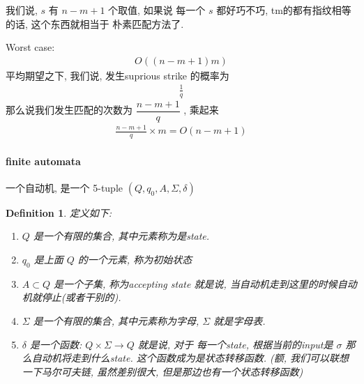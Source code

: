 \documentclass[a4paper, 10pt]{ctexart} %
\newtheorem{definition}{Definition}
\begin{document}
我们说, $s$ 有 $n-m+1$ 个取值, 
如果说 每一个 $s$ 都好巧不巧, 
tm的都有指纹相等的话, 这个东西就相当于
朴素匹配方法了. 

Worst case: 
\begin{align*}
    O \left( \left( n - m  + 1 \right) m\right)
\end{align*}
平均期望之下, 我们说, 发生suprious strike 的概率为 
\begin{align*}
    \frac{1}{q}
\end{align*}
那么说我们发生匹配的次数为 $\dfrac{n - m  + 1}{q}$ , 
乘起来
\begin{align*}
    \frac{n  - m+ 1 }{q} \times m = O\left( n - m + 1\right)
\end{align*}
\paragraph{finite automata} %
一个自动机, 是一个 5-tuple $ \left( Q ,q _{0} , A, \Sigma , \delta\right) $

\begin{definition}
定义如下:
\begin{enumerate}
    \item 
$ Q $ 是一个有限的集合, 其中元素称为是state.
    \item
$ q_{0} $ 是上面 $ Q $ 的一个元素, 称为初始状态
    \item 
$ A \subset Q $ 是一个子集, 称为accepting state 就是说, 当自动机走到这里的时候自动机就停止(或者干别的).
    \item 
$ \Sigma $ 是一个有限的集合, 其中元素称为字母, $ \Sigma $ 就是字母表.
    \item
$ \delta $ 是一个函数: $ Q \times \Sigma \to Q $ 
就是说, 对于
每一个state, 根据当前的input是 $ \sigma $ 
那么自动机将走到什么state. 这个函数成为是状态转移函数. 
(额, 我们可以联想一下马尔可夫链, 虽然差别很大, 但是那边也有一个状态转移函数)
\end{enumerate}
\end{definition}
\end{document}
